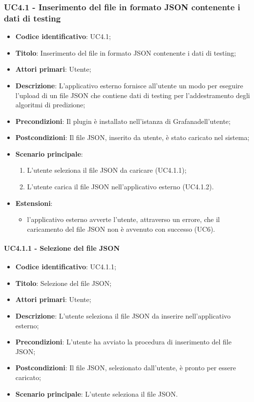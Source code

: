 \subsubsection{UC4.1 - Inserimento del file in formato JSON contenente i dati di testing}
\begin{itemize}
    \item \textbf{Codice identificativo}: UC4.1;
    \item \textbf{Titolo}: Inserimento del file in formato JSON contenente i dati di testing;
    \item \textbf{Attori primari}: Utente;
    \item \textbf{Descrizione}: L'applicativo esterno fornisce all'utente un modo per eseguire l'upload di un file JSON che contiene dati di testing per l'addestramento degli algoritmi di predizione;
    \item \textbf{Precondizioni}: Il plugin è installato nell'istanza di Grafana\glosp dell'utente;
    \item \textbf{Postcondizioni}: Il file JSON, inserito da utente, è stato caricato nel sistema;
    \item \textbf{Scenario principale}:
		\begin{enumerate}
			\item L'utente seleziona il file JSON da caricare (UC4.1.1);
			\item L'utente carica il file JSON nell'applicativo esterno (UC4.1.2).
		\end{enumerate}
    \item \textbf{Estensioni}:
        \begin{itemize}
            \item l'applicativo esterno avverte l'utente, attraverso un errore, che il caricamento del file JSON non è avvenuto con successo (UC6).
        \end{itemize}
\end{itemize}

\paragraph{UC4.1.1 - Selezione del file JSON}
\begin{itemize}
	\item \textbf{Codice identificativo}: UC4.1.1;
	\item \textbf{Titolo}: Selezione del file JSON;
	\item \textbf{Attori primari}: Utente;
	\item \textbf{Descrizione}: L'utente seleziona il file JSON da inserire nell'applicativo esterno;
	\item \textbf{Precondizioni}: L'utente ha avviato la procedura di inserimento del file JSON;
	\item \textbf{Postcondizioni}: Il file JSON, selezionato dall'utente, è pronto per essere caricato;
	\item \textbf{Scenario principale}: L'utente seleziona il file JSON.
\end{itemize}

